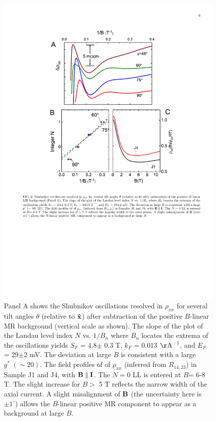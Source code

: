 \begin{figure}[!htbp]
  \begin{center}
\includegraphics[width=0.9\linewidth]{ch-na3bi/figures/FigSdHMR}
\caption{\label{figSdH}
Panel A shows the Shubnikov oscillations resolved in $\rho_{xx}$ for several tilt angles $\theta$ (relative to $\bf \hat{x}$) after subtraction of the positive $B$-linear MR background (vertical scale as shown). The slope of the plot of the Landau level index $N$ vs. $1/B_n$ where $B_n$ locates the extrema of the oscillations yields $S_F$ = 4.8$\pm$ 0.3 T, $k_F$ = 0.013 $\rm{\AA}^{-1}$, and $E_F$ = 29$\pm$2 mV.  The deviation at large $B$ is consistent with a large $g^*\; (\sim 20)$. The field profiles of of $\rho_{xx}$ (inferred from $R_{14,23}$) in Sample J1 and J4, with $\bf B\parallel I$. The $N =0$ LL is entered at $B$= 6-8 T. The slight increase for $B>$ 5 T reflects the narrow width of the axial current. A slight misalignment of $\bf B$ (the uncertainty here is $\pm 1^\circ$) allows the $B$-linear positive MR component to appear as a background at large $B$. 
}
  \end{center}
\end{figure}


